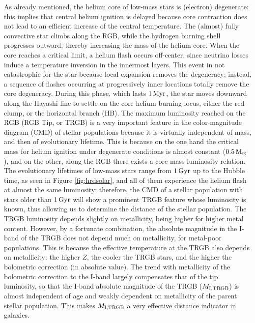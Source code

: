 \documentclass[a4paper,10pt]{article}
\begin{document}
{\noindent}As already mentioned, the helium core of low-mass stars is (electron) degenerate: this implies that central helium ignition is delayed because core contraction does not lead to an efficient increase of the central temperature. The (almost) fully convective star climbs along the RGB, while the hydrogen burning shell progresses outward, thereby increasing the mass of the helium core. When the core reaches a critical limit, a helium flash occurs off-center, since neutrino losses induce a temperature inversion in the innermost layers. This event in not catastrophic for the star because local expansion removes the degeneracy; instead, a sequence of flashes occurring at progressively inner locations totally remove the core degeneracy. During this phase, which lasts $1\,{\rm Myr}$, the star moves downward along the Hayashi line to settle on the core helium burning locus, either the red clump, or the horizontal branch (HB). The maximum luminosity reached on the RGB (RGB Tip, or TRGB) is a very important feature in the color-magnitude diagram (CMD) of stellar populations because it is virtually independent of mass, and then of evolutionary lifetime. This is because on the one hand the critical mass for helium ignition under degenerate conditions is almost constant ($0.5\,{\rm M_\odot}$), and on the other, along the RGB there exists a core mass-luminosity relation. The evolutionary lifetimes of low-mass stars range from $1\,{\rm Gyr}$ up to the Hubble time, as seen in Figure \ref{fig:hrdsolar}, and all of them experience the helium flash at almost the same luminosity; therefore, the CMD of a stellar population with stars older than $1\,{\rm Gyr}$ will show a prominent TRGB feature whose luminosity is known, thus allowing us to determine the distance of the stellar population. The TRGB luminosity depends slightly on metallicity, being higher for higher metal content. However, by a fortunate combination, the absolute magnitude in the I-band of the TRGB does not depend much on metallicity, for metal-poor populations. This is because the effective temperature at the TRGB also depends on metallicity: the higher $Z$, the cooler the TRGB stars, and the higher the bolometric correction (in absolute value). The trend with metallicity of the bolometric correction to the I-band largely compensates that of the tip luminosity, so that the I-band absolute magnitude of the TRGB ($M_{\rm I,TRGB}$) is almost independent of age and weakly dependent on metallicity of the parent stellar population. This makes $M_{\rm I,TRGB}$ a very effective distance indicator in galaxies.
\end{document}
